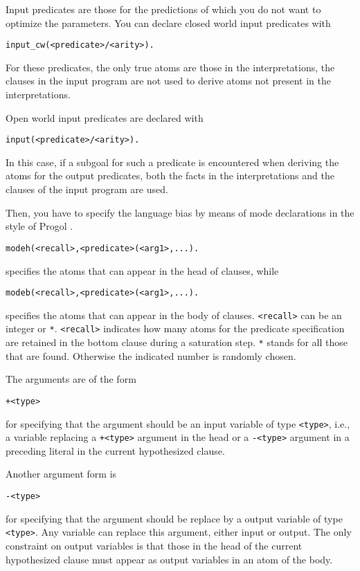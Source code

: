 \documentclass[a4paper,10pt]{article}
\newcommand{\href}[2]{\Link[#1]{}{} #2 \EndLink}
\begin{document}
Input predicates are those for the predictions of which you do not want to optimize the parameters. You can declare closed world input predicates with
\begin{verbatim}
input_cw(<predicate>/<arity>).
\end{verbatim}
For these predicates, the only true atoms are those in the interpretations, the clauses in the input program are not used to derive atoms not present in the interpretations.

Open world input predicates are declared with
\begin{verbatim}
input(<predicate>/<arity>).
\end{verbatim}
In this case, if a subgoal for such a predicate is encountered when deriving the atoms for the output predicates, 
both the facts in the interpretations and the clauses of the input program are used.

Then, you have to specify the language bias by means of mode declarations in the style of 
\href{http://www.doc.ic.ac.uk/\string ~shm/progol.html}{Progol}.
\begin{verbatim}
modeh(<recall>,<predicate>(<arg1>,...).
\end{verbatim}
specifies the atoms that can appear in the head of clauses, while
\begin{verbatim}
modeb(<recall>,<predicate>(<arg1>,...).
\end{verbatim}
specifies the atoms that can appear in the body of clauses.
\texttt{<recall>} can be an integer or \texttt{*}.
\texttt{<recall>} indicates how many atoms for the predicate specification are
retained in the bottom clause during a saturation step. \texttt{*} stands for all those that are found. Otherwise the indicated number is randomly chosen.

The arguments are of the form
\begin{verbatim}
+<type>
\end{verbatim}
for specifying that the argument should be an input variable of type \texttt{<type>}, i.e., a variable replacing a \texttt{+<type>} argument in the head or a \texttt{-<type>} argument in a preceding literal in the current hypothesized clause.

Another argument form is
\begin{verbatim}
-<type>
\end{verbatim}
for specifying that the argument should be replace by a output variable of type \texttt{<type>}. 
Any variable can replace this argument, either input or output.
The only constraint on output variables is that those in the head of the current hypothesized 
clause must appear as output variables in an atom of the body.
\end{document}
